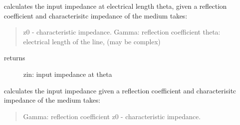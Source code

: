 \documentclass[letterpaper,10pt,english]{sphinxmanual}
\begin{document}
\begin{fulllineitems}
\label{api/mwavepy:mwavepy.tlineFunctions.Gamma0_2_zin}
calculates the input impedance at electrical length theta, given a
reflection coefficient and characterisitc impedance of the medium
takes:
\begin{quote}

z0 - characteristic impedance. 
Gamma: reflection coefficient
theta: electrical length of the line, (may be complex)
\end{quote}
\begin{description}
\item[{returns }] \leavevmode
zin: input impedance at theta

\end{description}

\end{fulllineitems}


\begin{fulllineitems}
\label{api/mwavepy:mwavepy.tlineFunctions.Gamma0_2_zl}
calculates the input impedance given a reflection coefficient and 
characterisitc impedance of the medium
takes:
\begin{quote}

Gamma: reflection coefficient
z0 - characteristic impedance.
\end{quote}

\end{fulllineitems}

\end{document}
